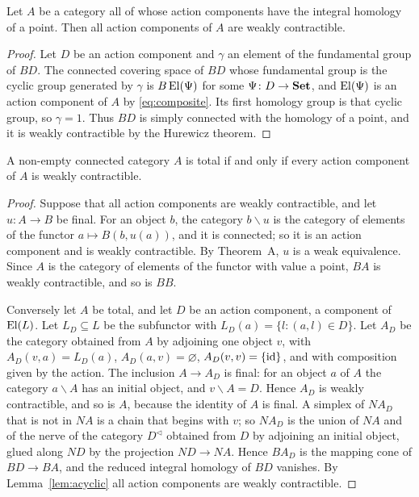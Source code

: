 \begin{lemma}\label{lem:acyclic}
Let $A$ be a category all of whose action components have the integral
homology of a point. Then all action components of $A$ are weakly
contractible.
\end{lemma}

\begin{proof}
Let $D$ be an action component and $\gamma$ an element of the fundamental
group of $BD$. The connected covering space of $BD$ whose fundamental group
is the cyclic group generated by $\gamma$ is $B\operatorname{El}(\Psi)$ for some
$\Psi\colon D\to\mathbf{Set}$, and $\operatorname{El}(\Psi)$ is an action component of $A$ by
\eqref{eq:composite}. Its first homology group is that cyclic group, so
$\gamma=1$. Thus $BD$ is simply connected with the homology of a point, and
it is weakly contractible by the Hurewicz theorem.
\end{proof}

\begin{proposition}\label{prop:total}
A non-empty connected category $A$ is total if and only if every action
component of $A$ is weakly contractible.
\end{proposition}

\begin{proof}
Suppose that all action components are weakly contractible, and let
$u\colon A\to B$ be final. For an object $b$, the category $b\backslash u$ is
the category of elements of the functor $a\mapsto B(b,u(a))$, and it is
connected; so it is an action component and is weakly contractible. By
Theorem~A, $u$ is a weak equivalence. Since $A$ is the category of elements
of the functor with value a point, $BA$ is weakly contractible, and so is
$BB$.

Conversely let $A$ be total, and let $D$ be an action component, a component
of $\operatorname{El}(L)$. Let $L_D\subseteq L$ be the subfunctor with
$L_D(a)=\{l:(a,l)\in D\}$. Let $A_D$ be the category obtained from $A$ by
adjoining one object $v$, with $A_D(v,a)=L_D(a)$, $A_D(a,v)=\varnothing$,
$A_D(v,v)=\{\mathrm{id}\}$, and with composition given by the action. The inclusion
$A\to A_D$ is final: for an object $a$ of $A$ the category $a\backslash A$
has an initial object, and $v\backslash A=D$. Hence $A_D$ is weakly
contractible, and so is $A$, because the identity of $A$ is final. A simplex
of $NA_D$ that is not in $NA$ is a chain that begins with $v$; so $NA_D$ is
the union of $NA$ and of the nerve of the category $D^{\triangleleft}$
obtained from $D$ by adjoining an initial object, glued along $ND$ by the
projection $ND\to NA$. Hence $BA_D$ is the mapping cone of $BD\to BA$, and
the reduced integral homology of $BD$ vanishes. By Lemma~\ref{lem:acyclic}
all action components are weakly contractible.
\end{proof}

